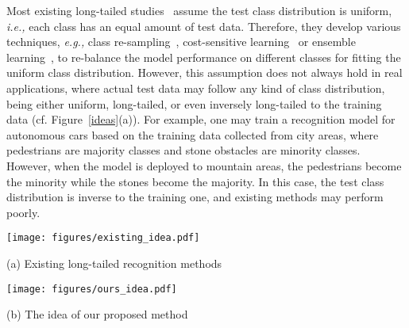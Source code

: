 \documentclass{article}
\def\eg{\emph{e.g.}} \def\Eg{\emph{E.g.}}
\def\ie{\emph{i.e.}} \def\Ie{\emph{I.e.}}
\def\ie{\emph{i.e., }}
\def\eg{\emph{e.g., }}
\begin{document}
 
Most existing long-tailed   studies~\cite{cao2019learning,cui2019class,deng2021pml,wang2021contrastive,weng2021unsupervised} assume   the test class distribution is uniform, \ie each class  has an equal amount of test data. Therefore, they develop various techniques, \eg class re-sampling~\cite{guo2021long,huang2016learning,kang2019decoupling,zang2021fasa}, cost-sensitive learning~\cite{feng2021exploring,Influence2021Park,tan2020equalization,wang2021seesaw} or ensemble learning~\cite{cai2021ace,guo2021long,li2020overcoming,xiang2020learning},  to re-balance the  model  performance   on different  classes for fitting the uniform class  distribution. However, this assumption does not always hold in real applications, where   actual   test data may follow any kind of class distribution, being either uniform, long-tailed, or even inversely long-tailed to the training data (cf. Figure~\ref{ideas}(a)). For example, one may train a  recognition model for autonomous cars based on the training data collected from city areas, where pedestrians are majority classes and stone obstacles are minority classes. However,  when the model is deployed to mountain areas, the pedestrians   become the minority while the stones become the majority.
In this case, the test class distribution is inverse to the training one, and existing    methods may perform poorly.
  

\begin{figure*}[t]\vspace{-0.15in} 
 \begin{minipage}{0.46\linewidth}
  \centering 
   \hspace{-0.15in} \texttt{[image: figures/existing\_idea.pdf]} 
  
   {\vspace{-0.05in}\hspace{-0.15in} \centerline{\small{(a) Existing long-tailed recognition methods}}}
  \end{minipage}
   \hfill  
  \begin{minipage}{0.51\linewidth}
    \centering
   \hspace{-0.15in}\texttt{[image: figures/ours\_idea.pdf]}
   
   {\vspace{-0.05in} \hspace{-0.15in}\centerline{\small{(b) The idea of our proposed method}}}
    \end{minipage}
     
  \caption{Illustration of test-agnostic long-tailed recognition. (a) Existing  long-tailed  recognition  methods  aim  to train   models  that perform well on test data with the uniform class distribution. However, the resulting models may fail to handle practical test class distributions that skew arbitrarily. (b) Our method seeks to learn a   multi-expert model from a single long-tailed training set, where  different experts are skilled  in handling different   class distributions, respectively. By reasonably aggregating    these   experts at test time, our method is able to handle       unknown test class distributions.}  
  \label{ideas}\vspace{-0.15in} 
\end{figure*} 
\end{document}
